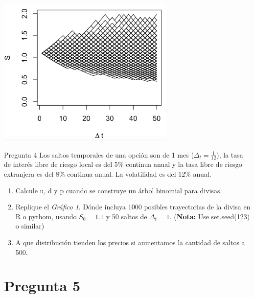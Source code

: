\documentclass{beamer}
\begin{document}
\newcommand{\Pregcuatro}{  Los saltos temporales de una opción son de 1 mes ($\Delta_t=\frac{1}{12}$), la tasa de interés libre de riesgo 
  local es del 5\% continua anual y la tasa libre de riesgo extranjera es del 8\% continua anual. 
  La volatilidad es del 12\% anual.}   
\newcommand{\Pregcuatroa}{Calcule u, d y p cuando se construye un árbol binomial para divisas. }
\newcommand{\Pregcuatrob}{Replique el \textit{Gráfico 1}. Dónde incluya 1000 posibles trayectorias de la divisa en R o pythom, 
  usando $S_0=1.1$ y 50 saltos de $\Delta_t=1$. {\footnotesize(\textbf{Nota:} Use set.seed(123) o similar)}}
\newcommand{\Pregcuatroc}{A que distribución tienden los precios si aumentamos la cantidad de saltos a 500. }
\includegraphics[height=20em]{../imagenes/Imagen 1.png}
\begin{frame}{Pregunta 4}
  \justify
\Pregcuatro
\vspace{1em}

\begin{enumerate}[label=\textbf{\alph*)}]
  \item \Pregcuatroa
  \item \Pregcuatrob
  \item \Pregcuatroc
\end{enumerate}

\end{frame}
\section{Pregunta 5}
\newcommand{\Pregcinco}{Considere una opción call Americana de una divisa. El valor de la divisa hoy es de \$700, 
el strike Price es de \$710, la tasa libre de riesgo local es del 12\% continua anual 
(la tasa libre de riesgo extranjera es del 4\% continua anual), la volatilidad es del 
40\% anual y la madurez del derivado es de 6 meses. }
\newcommand{\Pregcincoa}{Calcule u, d y p para un árbol binomial de dos pasos.}
\newcommand{\Pregcincob}{Calcule el valor de la opción.}
\newcommand{\Pregcincoc}{Verifique que se obtiene el mismo resultado usando R.}
\newcommand{\Pregcincod}{Calcule el valor de la opción para 5, 50, 100 y 500 pasos (usando R).}
\end{document}
